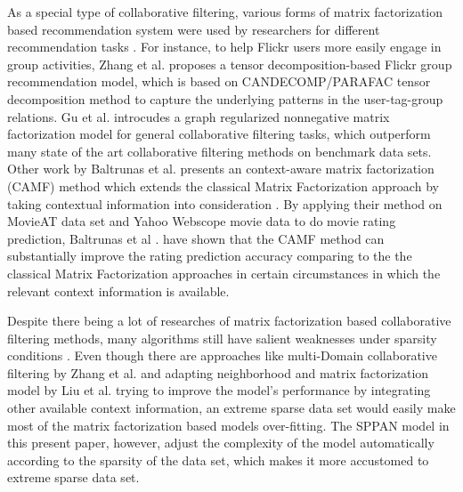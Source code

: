 \documentclass[conference,compsoc]{IEEEtran}
\begin{document}
As a special type of collaborative filtering, various forms of matrix factorization based recommendation system were used by researchers for different recommendation tasks \cite{ZitnikZ12, lin2007projected, lee2001algorithms, brunet2004metagenes, parambath2013matrix, ricci2011recommender}. For instance, to help Flickr users  more easily engage in group activities, Zhang et al. proposes a tensor decomposition-based Flickr group recommendation model, which is based on CANDECOMP/PARAFAC tensor decomposition method to capture the underlying patterns in the user-tag-group relations\cite{zheng2010flickr}. Gu et al. introcudes a graph regularized nonnegative matrix factorization model for general collaborative filtering tasks, which outperform many state of the art collaborative filtering methods on benchmark data sets\cite{gu2010collaborative}. Other work by Baltrunas et al. presents an context-aware matrix factorization (CAMF) method which extends the classical Matrix Factorization approach by taking contextual information into consideration \cite{baltrunas2011matrix}. By applying their method on MovieAT data set and Yahoo Webscope movie data to do movie rating prediction, Baltrunas et al . have shown that the CAMF method can substantially improve the rating prediction accuracy comparing to the the classical Matrix Factorization approaches in certain circumstances in which the relevant context information is available.

Despite there being a lot of researches of matrix factorization based collaborative filtering methods, many algorithms still have salient weaknesses under sparsity conditions \cite{cacheda2011comparison}. Even though there are approaches like multi-Domain collaborative filtering by Zhang et al. and adapting neighborhood and matrix factorization model by Liu et al. trying to improve the model's performance by integrating other available context information\cite{zhang2012multi, liu2010adapting}, an extreme sparse data set would easily make most of the matrix factorization based models over-fitting. The SPPAN model in this present paper, however, adjust the complexity of the model automatically according to the sparsity of the data set, which makes it more accustomed to extreme sparse data set.


%
\end{document}
